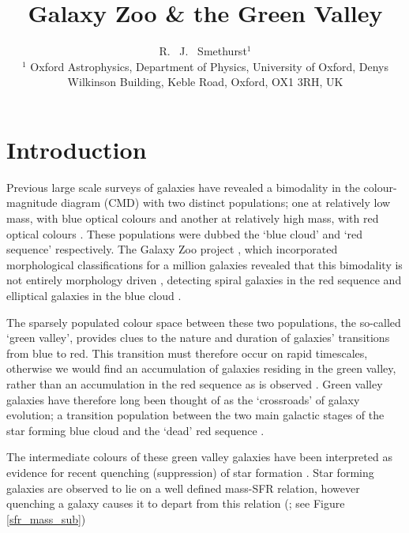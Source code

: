 \documentclass{mn2e}
\begin{document}
\title[Galaxy Zoo \& the Green Valley]{Galaxy Zoo \& the Green Valley}
\author[Smethurst et al. 2014]{R. ~J. ~Smethurst$^1$
\\ $^1$ Oxford Astrophysics, Department of Physics, University of Oxford, Denys Wilkinson Building, Keble Road, Oxford, OX1 3RH, UK }

\maketitle

\begin{abstract}

\end{abstract}

\section{Introduction}
Previous large scale surveys of galaxies have revealed a bimodality in the colour-magnitude diagram (CMD) with two distinct populations; one at relatively low mass, with blue optical colours and another at relatively high mass, with red optical colours \citep{Baldry04, Baldry06, Willmer06, BLB08, Brammer09}. These populations were dubbed the `blue cloud' and `red sequence' respectively. The Galaxy Zoo project \citep{Lintott11}, which incorporated morphological classifications for a million galaxies revealed that this bimodality is not entirely morphology driven \citep{Bamford09, Skibba09}, detecting spiral galaxies in the red sequence \citep{Masters10} and elliptical galaxies in the blue cloud \citep{Sch09}.  

The sparsely populated colour space between these two populations, the so-called `green valley', provides clues to the nature and duration of galaxies' transitions from blue to red. This transition must therefore occur on rapid timescales, otherwise we would find an accumulation of galaxies residing in the green valley, rather than an accumulation in the red sequence as is observed \citep{Arnouts07, Martin07}. Green valley galaxies have therefore long been thought of as the `crossroads' of galaxy evolution; a transition population between the two main galactic stages of the star forming blue cloud and the `dead' red sequence \citep{Bell04, Wyder07, Schim07, Martin07, Faber07, Mendez11, Gonc12, Sch2014}. 

The intermediate colours of these green valley galaxies have been interpreted as evidence for recent quenching (suppression) of star formation \citep{Salim07}. Star forming galaxies are observed to lie on a well defined mass-SFR relation, however quenching a galaxy causes it to depart from this relation (\citealt{Noeske07, Peng}; see Figure \ref{sfr_mass_sub})
\end{document}

